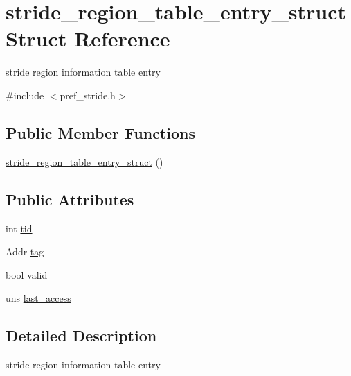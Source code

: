 \hypertarget{structstride__region__table__entry__struct}{
\section{stride\_\-region\_\-table\_\-entry\_\-struct Struct Reference}
\label{structstride__region__table__entry__struct}
}


stride region information table entry  




{\ttfamily \#include $<$pref\_\-stride.h$>$}

\subsection*{Public Member Functions}
\begin{DoxyCompactItemize}
\item 
\hyperlink{structstride__region__table__entry__struct_a714b1003bbcbc1ad137c472ca4e83aaa}{stride\_\-region\_\-table\_\-entry\_\-struct} ()
\end{DoxyCompactItemize}
\subsection*{Public Attributes}
\begin{DoxyCompactItemize}
\item 
int \hyperlink{structstride__region__table__entry__struct_a122e1ad69539f007576f15f7c313c7c0}{tid}
\item 
Addr \hyperlink{structstride__region__table__entry__struct_a5b2f4c2295e9943679e4b90d3763953c}{tag}
\item 
bool \hyperlink{structstride__region__table__entry__struct_a1fc1f07a14c8d308bf7bb7a7b36b60aa}{valid}
\item 
uns \hyperlink{structstride__region__table__entry__struct_a0118b9ae31d02a2eda63579019c3169e}{last\_\-access}
\end{DoxyCompactItemize}


\subsection{Detailed Description}
stride region information table entry 


